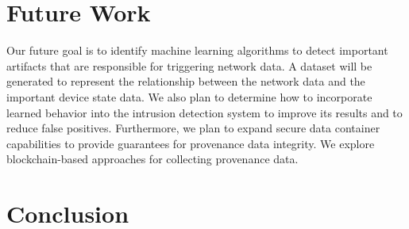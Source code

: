 \documentclass[conference]{IEEEtran}
\begin{document}
\section{Future Work}
Our future goal is to identify machine learning algorithms to detect important artifacts that are responsible for triggering network data. A dataset will be generated to represent the relationship between the network data and the important device state data. We also plan to determine how to incorporate learned behavior into the intrusion detection system to improve its results and to reduce false positives. Furthermore, we plan to expand secure data container capabilities to provide guarantees for provenance data integrity. We explore blockchain-based approaches for collecting provenance data.   

\section{Conclusion}
\end{document}
